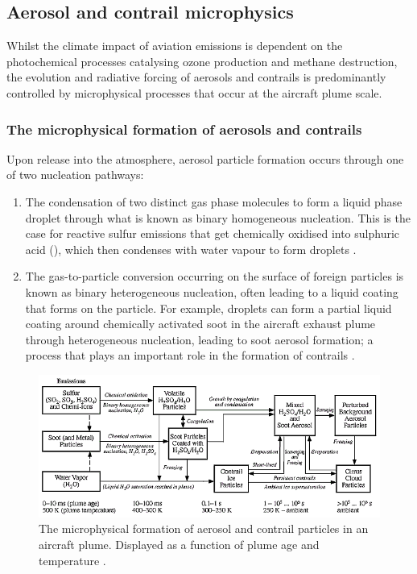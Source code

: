  \subsection{Aerosol and contrail microphysics}
\label{Microphysics}
Whilst the climate impact of aviation  emissions is dependent on the photochemical processes catalysing ozone production and methane destruction, the evolution and radiative forcing of aerosols and contrails is predominantly controlled by microphysical processes that occur at the aircraft plume scale. 

\subsubsection{The microphysical formation of aerosols and contrails}
Upon release into the atmosphere, aerosol particle formation occurs through one of two nucleation pathways: 

\begin{enumerate}
	\item The condensation of two distinct gas phase molecules to form a liquid phase droplet through what is known as binary homogeneous nucleation. This is the case for reactive sulfur emissions that get chemically oxidised into sulphuric acid (), which then condenses with water vapour to form  droplets \cite{Perry1994}.
	\item The gas-to-particle conversion occurring on the surface of foreign particles is known as binary heterogeneous nucleation, often leading to a liquid coating that forms on the particle. For example,  droplets can form a partial liquid coating around chemically activated soot in the aircraft exhaust plume through heterogeneous nucleation, leading to soot aerosol formation; a process that plays an important role in the formation of contrails \cite{Karcher1996a}.
\end{enumerate}

\begin{figure}[H]
  \centering
  \includegraphics[width=0.95\linewidth]{Aerosol_fig.png}
  \caption{The microphysical formation of aerosol and contrail particles in an aircraft plume. Displayed as a function of plume age and temperature \cite{IPCC1999}.}
  \label{Microphys_IPCC}
\end{figure}

